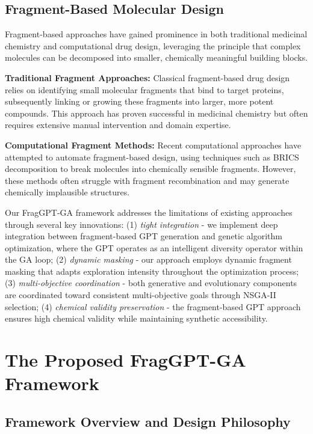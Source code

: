 \documentclass[lettersize,journal]{IEEEtran}
\begin{document}
\subsection{Fragment-Based Molecular Design}

Fragment-based approaches have gained prominence in both traditional medicinal chemistry and computational drug design, leveraging the principle that complex molecules can be decomposed into smaller, chemically meaningful building blocks.

\noindent \textbf{Traditional Fragment Approaches:} Classical fragment-based drug design relies on identifying small molecular fragments that bind to target proteins, subsequently linking or growing these fragments into larger, more potent compounds. This approach has proven successful in medicinal chemistry but often requires extensive manual intervention and domain expertise.

\noindent \textbf{Computational Fragment Methods:} Recent computational approaches have attempted to automate fragment-based design, using techniques such as BRICS decomposition to break molecules into chemically sensible fragments. However, these methods often struggle with fragment recombination and may generate chemically implausible structures.

Our FragGPT-GA framework addresses the limitations of existing approaches through several key innovations: (1) \textit{tight integration} - we implement deep integration between fragment-based GPT generation and genetic algorithm optimization, where the GPT operates as an intelligent diversity operator within the GA loop; (2) \textit{dynamic masking} - our approach employs dynamic fragment masking that adapts exploration intensity throughout the optimization process; (3) \textit{multi-objective coordination} - both generative and evolutionary components are coordinated toward consistent multi-objective goals through NSGA-II selection; (4) \textit{chemical validity preservation} - the fragment-based GPT approach ensures high chemical validity while maintaining synthetic accessibility.



\section{The Proposed FragGPT-GA Framework}

\subsection{Framework Overview and Design Philosophy}
\end{document}

